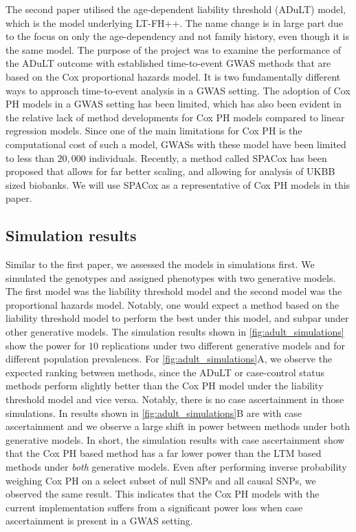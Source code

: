 The second paper utilised the age-dependent liability threshold (ADuLT) model, which is the model underlying LT-FH++. The name change is in large part due to the focus on only the age-dependency and not family history, even though it is the same model. The purpose of the project was to examine the performance of the ADuLT outcome with established time-to-event GWAS methods that are based on the Cox proportional hazards model. It is two fundamentally different ways to approach time-to-event analysis in a GWAS setting. The adoption of Cox PH models in a GWAS setting has been limited, which has also been evident in the relative lack of method developments for Cox PH models compared to linear regression models. Since one of the main limitations for Cox PH is the computational cost of such a model, GWASs with these model have been limited to less than $ 20,000 $ individuals. Recently, a method called SPACox \cite{bi2020fast} has been proposed that allows for far better scaling, and allowing for analysis of UKBB sized biobanks. We will use SPACox as a representative of Cox PH models in this paper.


\subsection{Simulation results}

Similar to the first paper, we assessed the models in simulations first. We simulated the genotypes and assigned phenotypes with two generative models. The first model was the liability threshold model and the second model was the proportional hazards model. Notably, one would expect a method based on the liability threshold model to perform the best under this model, and subpar under other generative models. The simulation results shown in \cref{fig:adult_simulations} show the power for $ 10 $ replications under two different generative models and for different population prevalences. For \cref{fig:adult_simulations}A, we observe the expected ranking between methods, since the ADuLT or case-control status methods perform slightly better than the Cox PH model under the liability threshold model and vice versa. Notably, there is no case ascertainment in those simulations. In results shown in \cref{fig:adult_simulations}B are with case ascertainment and we observe a large shift in power between methods under both generative models. In short, the simulation results with case ascertainment show that the Cox PH based method has a far lower power than the LTM based methods under \textit{both} generative models. Even after performing inverse probability weighing Cox PH on a select subset of null SNPs and all causal SNPs, we observed the same result. This indicates that the Cox PH models with the current implementation suffers from a significant power loss when case ascertainment is present in a GWAS setting.


